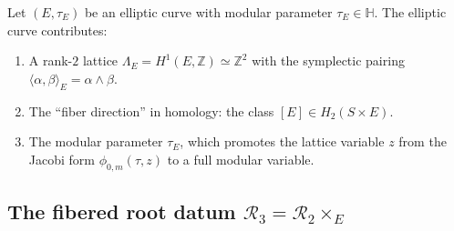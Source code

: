 \documentclass[11pt]{article}
\theoremstyle{plain}
\theoremstyle{definition}
\theoremstyle{remark}
\newcommand{\cR}{\mathcal{R}}
\begin{document}
Let $(E, \tau_E)$ be an elliptic curve with modular parameter
$\tau_E \in \mathbb{H}$. The elliptic curve contributes:

\begin{enumerate}[label=(\roman*)]
\item A rank-$2$ lattice $\Lambda_E = H^1(E, \mathbb{Z}) \simeq \mathbb{Z}^2$
 with the symplectic pairing $\langle \alpha, \beta \rangle_E = \alpha \wedge \beta$.

\item The ``fiber direction'' in homology: the class $[E] \in H_2(S \times E)$.

\item The modular parameter $\tau_E$, which promotes the lattice variable $z$
 from the Jacobi form $\phi_{0,m}(\tau, z)$ to a full modular variable.
\end{enumerate}

\subsection{The fibered root datum $\cR_3 = \cR_2 \times_E$}
\label{subsec:fibered-root-datum}
\end{document}
